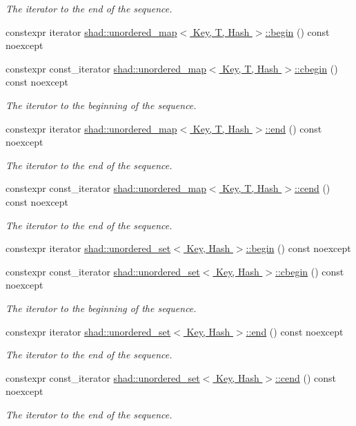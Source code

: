 \begin{DoxyCompactItemize}
\begin{DoxyCompactList}\small\item\em The iterator to the end of the sequence. \end{DoxyCompactList}\item 
constexpr iterator \hyperlink{group__Iterators_ga3753eddf67b531a3718ae7eb1e33b131}{shad\-::unordered\-\_\-map$<$ Key, T, Hash $>$\-::begin} () const noexcept
\item 
constexpr const\-\_\-iterator \hyperlink{group__Iterators_gaf264a3126cd78a96da927c0f17890fca}{shad\-::unordered\-\_\-map$<$ Key, T, Hash $>$\-::cbegin} () const noexcept
\begin{DoxyCompactList}\small\item\em The iterator to the beginning of the sequence. \end{DoxyCompactList}\item 
constexpr iterator \hyperlink{group__Iterators_ga5a1c3f388ffec559f61de7e2eb17eaa2}{shad\-::unordered\-\_\-map$<$ Key, T, Hash $>$\-::end} () const noexcept
\begin{DoxyCompactList}\small\item\em The iterator to the end of the sequence. \end{DoxyCompactList}\item 
constexpr const\-\_\-iterator \hyperlink{group__Iterators_ga563bf6f0949e2ed31c86fc2b22f26df1}{shad\-::unordered\-\_\-map$<$ Key, T, Hash $>$\-::cend} () const noexcept
\begin{DoxyCompactList}\small\item\em The iterator to the end of the sequence. \end{DoxyCompactList}\item 
constexpr iterator \hyperlink{group__Iterators_gaed1fcf07d265d37157a2bd2614b32693}{shad\-::unordered\-\_\-set$<$ Key, Hash $>$\-::begin} () const noexcept
\item 
constexpr const\-\_\-iterator \hyperlink{group__Iterators_ga4317481540662a5afe3078e89b8012dd}{shad\-::unordered\-\_\-set$<$ Key, Hash $>$\-::cbegin} () const noexcept
\begin{DoxyCompactList}\small\item\em The iterator to the beginning of the sequence. \end{DoxyCompactList}\item 
constexpr iterator \hyperlink{group__Iterators_ga8ef3a0bbbef71c5658dbb7d6bd9751e9}{shad\-::unordered\-\_\-set$<$ Key, Hash $>$\-::end} () const noexcept
\begin{DoxyCompactList}\small\item\em The iterator to the end of the sequence. \end{DoxyCompactList}\item 
constexpr const\-\_\-iterator \hyperlink{group__Iterators_ga5be7a60951a7f054b7770b385e370840}{shad\-::unordered\-\_\-set$<$ Key, Hash $>$\-::cend} () const noexcept
\begin{DoxyCompactList}\small\item\em The iterator to the end of the sequence. \end{DoxyCompactList}\end{DoxyCompactItemize}


